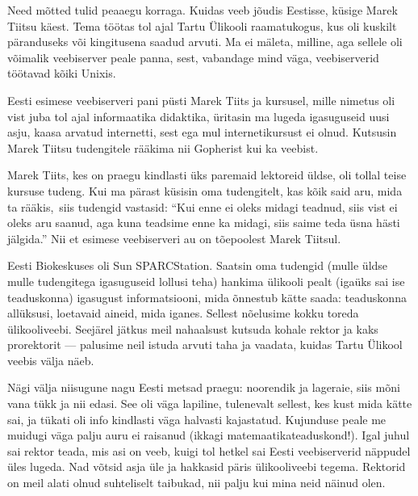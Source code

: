 
Need mõtted tulid peaaegu korraga. Kuidas veeb jõudis Eestisse, 
küsige Marek Tiitsu käest. Tema töötas tol ajal Tartu 
Ülikooli raamatukogus, kus oli kuskilt 
päranduseks või kingitusena saadud arvuti. Ma ei mäleta, milline, aga sellele oli võimalik veebiserver peale panna, sest, 
vabandage mind väga, veebiserverid töötavad kõiki Unixis. 

Eesti esimese veebiserveri pani püsti Marek Tiits 
ja kursusel, mille nimetus oli vist juba tol ajal informaatika 
didaktika, üritasin ma lugeda igasuguseid uusi asju, kaasa arvatud internetti, sest ega mul internetikursust ei olnud. 
Kutsusin Marek Tiitsu tudengitele rääkima nii Gopherist kui 
ka veebist. 

Marek Tiits, kes on praegu kindlasti üks paremaid 
lektoreid üldse, oli tollal teise kursuse tudeng. Kui ma pärast küsisin oma 
tudengitelt, kas kõik said aru, mida ta 
rääkis, siis tudengid vastasid: \enquote{Kui enne ei oleks midagi 
teadnud, siis vist ei oleks aru saanud, aga kuna teadsime enne ka midagi, 
siis saime teda üsna hästi jälgida.} Nii et esimese veebiserveri au on tõepoolest
Marek Tiitsul. 

Eesti Biokeskuses oli Sun SPARCStation. 
Saatsin oma tudengid (mulle üldse mulle tudengitega igasuguseid 
lollusi teha) hankima ülikooli pealt (igaüks sai ise teaduskonna) 
igasugust informatsiooni, mida õnnestub kätte saada: teaduskonna 
allüksusi, loetavaid aineid, mida iganes. Sellest nõelusime kokku
toreda ülikooliveebi. Seejärel jätkus meil nahaalsust kutsuda kohale 
rektor ja kaks prorektorit --- palusime neil istuda arvuti taha ja vaadata, kuidas 
Tartu Ülikool veebis välja näeb. 


Nägi välja niisugune nagu Eesti metsad praegu: 
noorendik ja lageraie, siis mõni vana tükk ja nii edasi. See oli väga 
lapiline, tulenevalt sellest, kes kust mida kätte sai, ja tükati oli info kindlasti väga halvasti kajastatud. Kujunduse peale me muidugi 
väga palju auru ei raisanud (ikkagi matemaatikateaduskond!). Igal 
juhul sai rektor teada, mis asi on veeb, kuigi tol hetkel sai Eesti veebiserverid
näppudel üles lugeda. Nad võtsid asja üle ja hakkasid päris ülikooliveebi tegema. Rektorid on meil 
alati olnud suhteliselt taibukad, nii palju kui mina neid näinud olen. 

